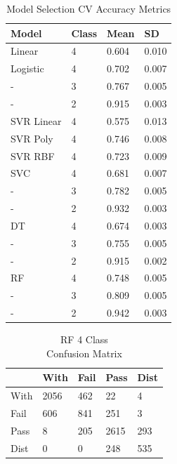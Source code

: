 \documentclass[11pt, a4paper]{article}
\begin{document}
\begin{multicols}{3}
	\begin{table}[H]
		\centering
		\captionsetup{justification=centering,margin=1cm}
		\begin{tabular}{|l|l|l|l|}
			\hline
			Model                 & Class & Mean &SD \\ \hline
			Linear& 4 & 0.604 & 0.010 \\ \hline
			Logistic& 4 & 0.702 & 0.007 \\ \hline
			- & 3 & 0.767 & 0.005 \\ \hline
			- & 2 & 0.915 & 0.003 \\ \hline
			SVR Linear & 4 & 0.575 & 0.013 \\ \hline
			SVR Poly & 4 & 0.746 & 0.008 \\ \hline
			SVR RBF & 4 & 0.723 & 0.009 \\ \hline
			SVC & 4 & 0.681 & 0.007 \\ \hline
			- & 3 & 0.782 & 0.005 \\ \hline
			- & 2 & 0.932 & 0.003 \\ \hline
			DT& 4 & 0.674 & 0.003 \\ \hline
			- & 3 & 0.755 & 0.005 \\ \hline
			- & 2 & 0.915 & 0.002 \\ \hline
			RF & 4 & 0.748 & 0.005 \\ \hline
			- & 3 & 0.809 & 0.005 \\ \hline
			- & 2 & 0.942 & 0.003 \\ \hline
			\end{tabular}
		\caption{Model Selection CV Accuracy Metrics}
		\label{table:modelSelection}
	\end{table}

	\begin{table}[H]
		\centering
		\captionsetup{justification=centering,margin=1cm}
		\begin{tabular}{|l|l|l|l|l|}
			\hline
							&	With 	&  Fail & Pass  & Dist \\ \hline
			With      &  	2056 		&  462  &   22  &         4 \\ \hline
			Fail           &   606 		&  841  & 251   &         3 \\ \hline
			Pass          &     8  		&  205  & 2615  &        293 \\ \hline
			Dist     &     0  		&   0   & 248   &       535 \\ \hline
			\end{tabular}
		\centering
		\caption{RF 4 Class \\Confusion Matrix}
		\label{table:RF4Confusion}
	\end{table}



\end{multicols}
\end{document}
